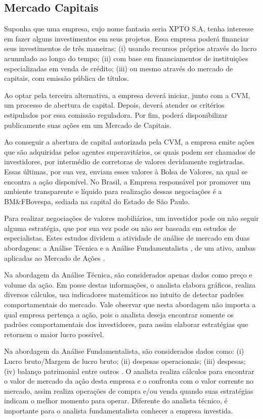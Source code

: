 \subsection{Mercado Capitais}

Suponha que uma empresa, cujo nome fantasia seria XPTO S.A, tenha interesse em fazer alguns investimentos em seus projetos. Essa empresa poderá financiar seus investimentos de três maneiras: (i) usando recursos próprios através do lucro acumulado ao longo do tempo; (ii) com base em financiamentos de instituições especializadas em venda de crédito; (iii) ou mesmo através do mercado de capitais, com emissão pública de títulos.
	
Ao optar pela terceira alternativa, a empresa deverá iniciar, junto com a CVM, um processo de abertura de capital. Depois, deverá atender os critérios estipulados por essa comissão reguladora. Por fim, poderá disponibilizar publicamente suas ações  em um Mercado de Capitais. 

Ao conseguir a abertura de capital autorizada pela CVM, a empresa emite ações que são adquiridas pelos agentes superavitários, os quais podem ser chamados de investidores, por intermédio de corretoras de valores devidamente registradas. Essas últimas, por sua vez, enviam esses valores à Bolsa de Valores, na qual se encontra a ação disponível. No Brasil, a Empresa responsável por promover um ambiente transparente e líquido para realização dessas negociações é a BM\&FBovespa, sediada na capital do Estado de São Paulo.

Para realizar negociações de valores mobiliários, um investidor pode ou não seguir alguma estratégia, que por sua vez pode ou não ser baseada em estudos de especialistas. Estes estudos dividem a atividade de análise de mercado em duas abordagens: a Análise Técnica \cite{noronha2010} e a Análise Fundamentalista \cite{buffet2010}, de um ativo, ambas aplicadas ao Mercado de Ações .

Na abordagem da Análise Técnica, são considerados apenas dados como preço e volume da ação. Em posse destas informações, o analista elabora gráficos, realiza diversos cálculos, usa indicadores matemáticos no intuito de detectar padrões comportamentais do mercado. Vale observar que nesta abordagem não importa a qual empresa pertença a ação, pois o analista deseja encontrar somente os padrões comportamentais dos investidores, para assim elaborar estratégias que retornem o maior lucro possível.

Na abordagem da Análise Fundamentalista, são considerados dados como: (i) Lucro bruto/Margem de lucro bruto; (ii) despesas operacionais; (iii) despesas; (iv) balanço patrimonial  entre outros \cite{buffet2010}. O analista realiza cálculos para encontrar o valor de mercado da ação desta empresa e o confronta com o valor corrente no mercado, assim realiza operações de compra e/ou venda quando suas estratégias indicam o melhor momento para operar. Diferente do analista técnico, é importante para o analista fundamentalista conhecer a empresa investida.

